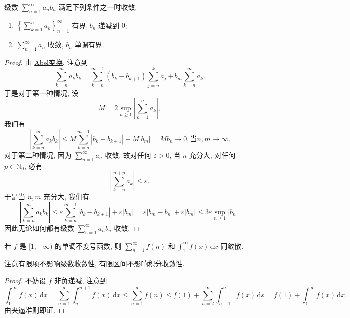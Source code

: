 \documentclass[../../main.tex]{subfiles}%
\begin{document}
\begin{theorem}[A-D判别法]
级数 \( \sum_{n=1}^\infty a_n b_n \) 满足下列条件之一时收敛.
\begin{enumerate}[(1)]
\item \( \left\{ \sum_{k=1}^n a_k \right\}_{n=1}^\infty \) 有界, \( b_n \) 递减到 \( 0 \);

\item \( \sum_{n=1}^\infty a_n \) 收敛, \( b_n \) 单调有界.
\end{enumerate}
\end{theorem}
\begin{proof}
由 \hyperref[theorem:Abel变换]{Abel变换}, 注意到
\[
\sum_{k=n}^m a_k b_k = \sum_{k=n}^{m - 1} (b_k - b_{k + 1}) \sum_{j=n}^k a_j + b_m \sum_{k=n}^m a_k.
\]
于是对于第一种情况, 设
\[
M = 2 \sup_{n \geqslant 1} \left| \sum_{k=1}^n a_k \right|,
\]
我们有
\[
\left| \sum_{k=n}^m a_k b_k \right| \leqslant M \sum_{k=n}^{m - 1} |b_k - b_{k + 1}| + M |b_m| = M b_n \to 0, \text{当} n, m \to \infty.
\]
对于第二种情况, 因为 \( \sum_{n=1}^\infty a_n \) 收敛, 故对任何 \( \varepsilon > 0 \), 当 \( n \) 充分大, 对任何 \( p \in \mathbb{N}_0 \), 必有
\[
\left| \sum_{k=n}^{n + p} a_k \right| \leqslant \varepsilon.
\]
于是当 \( n, m \) 充分大, 我们有
\[
\left| \sum_{k=n}^m a_k b_k \right| \leqslant \varepsilon \sum_{k=n}^{m - 1} |b_k - b_{k + 1}| + \varepsilon |b_m| = \varepsilon |b_m - b_n| + \varepsilon |b_m| \leqslant 3 \varepsilon \sup_{n \geqslant 1} |b_n|.
\]
因此无论如何都有级数 \( \sum_{n=1}^\infty a_n b_n \) 收敛.
\end{proof}

\begin{theorem}[积分判别法]\label{theorem:积分判别法}
若 \( f \) 是 \( [1, +\infty) \) 的单调不变号函数, 则 \( \sum_{n=1}^\infty f(n) \) 和 \( \int_1^\infty f(x) \, \mathrm{d}x \) 同敛散.
\end{theorem}
\begin{remark}
注意有限项不影响级数收敛性, 有限区间不影响积分收敛性.
\end{remark}
\begin{proof}
不妨设 \( f \) 非负递减, 注意到
\[
\int_1^\infty f(x) \, \mathrm{d}x = \sum_{n=1}^\infty \int_n^{n + 1} f(x) \, \mathrm{d}x \leqslant \sum_{n=1}^\infty f(n) \leqslant f(1) + \sum_{n=2}^\infty \int_{n - 1}^n f(x) \, \mathrm{d}x = f(1) + \int_1^\infty f(x) \, \mathrm{d}x.
\]
由夹逼准则即证.
\end{proof}
\end{document}
